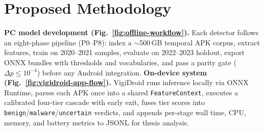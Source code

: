 \documentclass[conference]{IEEEtran}
\begin{document}
\begin{minipage}[t]{0.485\textwidth}
		\section{Proposed Methodology}
		\textbf{PC model development (Fig.~\ref{fig:offline-workflow}).}
		Each detector follows an eight-phase pipeline (P0--P8): index a $\sim$500\,GB temporal APK corpus, extract features, train on 2020--2021 samples, evaluate on 2022--2023 holdout, export ONNX bundles with thresholds and vocabularies, and pass a parity gate ($\Delta p \leq 10^{-4}$) before any Android integration.
		\textbf{On-device system (Fig.~\ref{fig:vigidroid-app-flow}).}
		VigiDroid runs inference locally via ONNX Runtime, parses each APK once into a shared \texttt{FeatureContext}, executes a calibrated four-tier cascade with early exit, fuses tier scores into \texttt{benign}/\texttt{malware}/\texttt{uncertain} verdicts, and appends per-stage wall time, CPU, memory, and battery metrics to JSONL for thesis analysis.
	\end{minipage}\hfill
\end{document}
